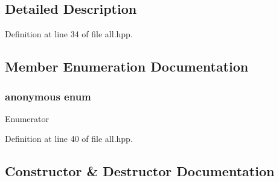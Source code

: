 \subsection{Detailed Description}


Definition at line 34 of file all.\+hpp.



\subsection{Member Enumeration Documentation}
\hypertarget{class_parsers_helper_ac5239b5c4a61b2f239f668b738f613be}{}\subsubsection[{anonymous enum}]{\setlength{\rightskip}{0pt plus 5cm}anonymous enum\hspace{0.3cm}{\ttfamily [private]}}\label{class_parsers_helper_ac5239b5c4a61b2f239f668b738f613be}
\begin{Desc}
\item[Enumerator]\par
\begin{description}
\item[{\em 
\hypertarget{class_parsers_helper_ac5239b5c4a61b2f239f668b738f613bea11c61fd76dd1cc499d0a82c995b29009}{}Construct\label{class_parsers_helper_ac5239b5c4a61b2f239f668b738f613bea11c61fd76dd1cc499d0a82c995b29009}
}]\item[{\em 
\hypertarget{class_parsers_helper_ac5239b5c4a61b2f239f668b738f613beae4bcb2b09e1ae01be6741b0d5dff5252}{}Parse\label{class_parsers_helper_ac5239b5c4a61b2f239f668b738f613beae4bcb2b09e1ae01be6741b0d5dff5252}
}]\end{description}
\end{Desc}


Definition at line 40 of file all.\+hpp.



\subsection{Constructor \& Destructor Documentation}
\hypertarget{class_parsers_helper_a4abfe81f7251ffe4635c2ed2e482645d}{}
